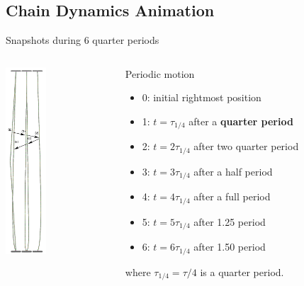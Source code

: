 \documentclass[t,presentation]{beamer}
\begin{document}
\subsection{Chain Dynamics Animation}
\label{sec:org544d6d4}
\begin{frame}[label={sec:orgd5aa4b4}]{Snapshots during 6 quarter periods}
\vspace{0.25cm}
\begin{columns}[c]
\begin{column}{.25\textwidth}
\centering
\includegraphics[height=2.75in]{figures/pvdf_short_time_shots_1p5zoom_crop_anno_arrow2.png}
\par
\end{column}
\begin{column}{.65\textwidth} %
Periodic motion
\begin{itemize}
\item 0: initial rightmost position
\item 1: $t=\tau_{1/4}$ after a \textbf{quarter period}
\item 2: $t=2\tau_{1/4}$ after two quarter period
\item 3: $t=3\tau_{1/4}$ after a half period
\item 4: $t=4\tau_{1/4}$ after a full period
\item 5: $t=5\tau_{1/4}$ after 1.25 period
\item 6: $t=6\tau_{1/4}$ after 1.50 period
\end{itemize}
where $\tau_{1/4}=\tau/4$ is a quarter period.
\end{column}
\end{columns}
\end{frame}
\end{document}
